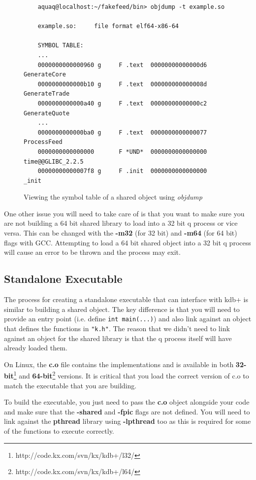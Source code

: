 \begin{figure}[h]
	\begin{lstlisting}
	aquaq@localhost:~/fakefeed/bin> objdump -t example.so
	
	example.so:     file format elf64-x86-64
	
	SYMBOL TABLE:
	...
	0000000000000960 g     F .text	00000000000000d6              GenerateCore
	0000000000000b10 g     F .text	000000000000008d              GenerateTrade
	0000000000000a40 g     F .text	00000000000000c2              GenerateQuote
	...
	0000000000000ba0 g     F .text	0000000000000077              ProcessFeed
	0000000000000000       F *UND*	0000000000000000              time@@GLIBC_2.2.5
	00000000000007f8 g     F .init	0000000000000000              _init
	\end{lstlisting}
	\caption{Viewing the symbol table of a shared object using \textit{objdump}}
\end{figure}

One other issue you will need to take care of is that you want to make sure you are not building a 64 bit
shared library to load into a 32 bit q process or vice versa. This can be changed with the \textbf{-m32}
(for 32 bit) and \textbf{-m64} (for 64 bit) flags with GCC. Attempting to load a 64 bit shared object into
a 32 bit q process will cause an error to be thrown and the process may exit.

\subsection{Standalone Executable}

The process for creating a standalone executable that can interface with kdb+ is similar to building a shared
object. The key difference is that you will need to provide an entry point (i.e. define \verb|int main(...)|)
and also link against an object that defines the functions in \verb|"k.h"|. The reason that we didn't need to
link against an object for the shared library is that the q process itself will have already loaded them.

On Linux, the \textbf{c.o} file contains the implementations and is available in both \textbf{32-bit}\footnote{http://code.kx.com/svn/kx/kdb+/l32/} and \textbf{64-bit}\footnote{http://code.kx.com/svn/kx/kdb+/l64/} versions. It is critical that you load the correct
version of c.o to match the executable that you are building.

To build the executable, you just need to pass the \textbf{c.o} object alongside your code and make sure that
the \textbf{-shared} and \textbf{-fpic} flags are not defined. You will need
to link against the \textbf{pthread} library using \textbf{-lpthread} too as this is required for some of the
functions to execute correctly.


